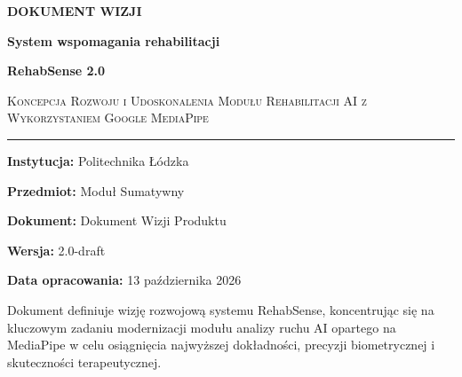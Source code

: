 \documentclass[11pt,a4paper]{article}
\begin{document}

\begin{titlepage}
\centering
\vspace*{1.5cm}
{\Huge\bfseries\color{primary} DOKUMENT WIZJI\par}
\vspace{0.4cm}
{\LARGE\bfseries System wspomagania rehabilitacji\par}
\vspace{0.3cm}
{\Huge\bfseries\color{accent} RehabSense 2.0\par}
\vspace{0.8cm}
{\large\textsc{Koncepcja Rozwoju i Udoskonalenia Modułu Rehabilitacji AI z Wykorzystaniem Google MediaPipe}\par}
\vspace{1.2cm}
\rule{0.75\textwidth}{1.2pt}\par
\vspace{1.2cm}

{\large\textbf{Instytucja:} Politechnika Łódzka\par}
\vspace{0.3cm}
{\large\textbf{Przedmiot:} Moduł Sumatywny\par}
\vspace{0.3cm}
{\large\textbf{Dokument:} Dokument Wizji Produktu\par}
\vspace{0.3cm}
{\large\textbf{Wersja:} 2.0-draft\par}
\vspace{0.3cm}
{\large\textbf{Data opracowania:} 13 października 2026\par}

\vfill
{\small Dokument definiuje wizję rozwojową systemu RehabSense, koncentrując się na kluczowym zadaniu modernizacji modułu analizy ruchu AI opartego na MediaPipe w celu osiągnięcia najwyższej dokładności, precyzji biometrycznej i skuteczności terapeutycznej.}
\end{titlepage}

\newpage
{}

\end{document}
